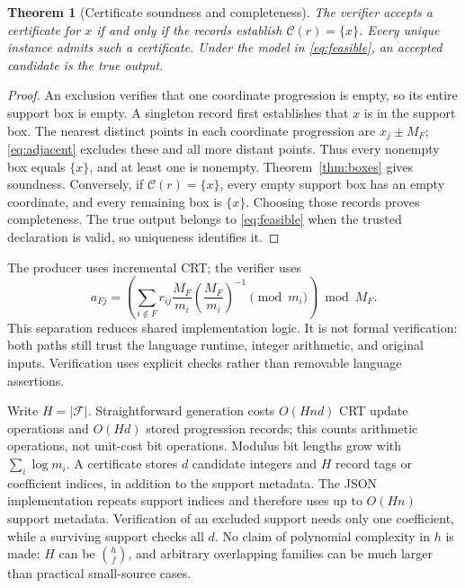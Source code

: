\documentclass[11pt]{article}
\newtheorem{theorem}{Theorem}
\theoremstyle{definition}\newtheorem{definition}[theorem]{Definition}
\newcommand{\F}{\mathcal F}
\newcommand{\C}{\mathcal C}
\begin{document}
\begin{theorem}[Certificate soundness and completeness]\label{thm:cert}
The verifier accepts a certificate for $x$ if and only if the records establish $\C(r)=\{x\}$. Every unique instance admits such a certificate. Under the model in \eqref{eq:feasible}, an accepted candidate is the true output.
\end{theorem}
\begin{proof}
An exclusion verifies that one coordinate progression is empty, so its entire support box is empty. A singleton record first establishes that $x$ is in the support box. The nearest distinct points in each coordinate progression are $x_j\pm M_F$; \eqref{eq:adjacent} excludes these and all more distant points. Thus every nonempty box equals $\{x\}$, and at least one is nonempty. Theorem~\ref{thm:boxes} gives soundness. Conversely, if $\C(r)=\{x\}$, every empty support box has an empty coordinate, and every remaining box is $\{x\}$. Choosing those records proves completeness. The true output belongs to \eqref{eq:feasible} when the trusted declaration is valid, so uniqueness identifies it.
\end{proof}

The producer uses incremental CRT; the verifier uses
\begin{equation}
 a_{Fj}=\left(\sum_{i\notin F}r_{ij}\frac{M_F}{m_i}
    \left(\frac{M_F}{m_i}\right)^{-1}\!\!\!\pmod {m_i}\right)\bmod M_F.
\end{equation}
This separation reduces shared implementation logic. It is not formal verification: both paths still trust the language runtime, integer arithmetic, and original inputs. Verification uses explicit checks rather than removable language assertions.

Write $H=|\F|$. Straightforward generation costs $O(Hnd)$ CRT update operations and $O(Hd)$ stored progression records; this counts arithmetic operations, not unit-cost bit operations. Modulus bit lengths grow with $\sum_i\log m_i$. A certificate stores $d$ candidate integers and $H$ record tags or coefficient indices, in addition to the support metadata. The JSON implementation repeats support indices and therefore uses up to $O(Hn)$ support metadata. Verification of an excluded support needs only one coefficient, while a surviving support checks all $d$. No claim of polynomial complexity in $h$ is made: $H$ can be $\binom hf$, and arbitrary overlapping families can be much larger than practical small-source cases.
\end{document}
